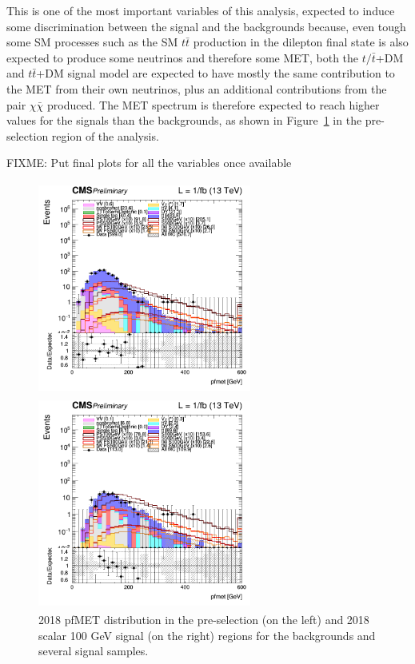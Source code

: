 \documentclass[a4paper, 10pt, openright]{report}
\begin{document}
This is one of the most important variables of this analysis, expected to induce some discrimination between the signal and the backgrounds because, even tough some \ac{SM} processes such as the \ac{SM} $t \bar t$ production in the dilepton final state is also expected to produce some neutrinos and therefore some \ac{MET}, both the $t/ \bar t$+DM and $t \bar t$+DM signal model are expected to have mostly the same contribution to the \ac{MET} from their own neutrinos, plus an additional contributions from the pair $\chi \bar \chi$ produced. The \ac{MET} spectrum is therefore expected to reach higher values for the signals than the backgrounds, as shown in Figure~\ref{fig:SRdiscMET} in the pre-selection region of the analysis.

\color{red} FIXME: Put final plots for all the variables once available \color{black}

\begin{figure}[htbp]
\centering
\begin{minipage}[b]{.47\textwidth}
\includegraphics[width=7cm, height=7cm]{figs/2018/log_cratio_topCR_ll_METcorrected_pt.png}
\end{minipage}\hfill
\begin{minipage}[b]{.47\textwidth}
\includegraphics[width=7cm, height=7cm]{figs/2018/log_cratio_topCR_ll_DNN_signal0_scalar100_METcorrected_pt.png}
\end{minipage}\hfill
\caption{2018 pf\ac{MET} distribution in the pre-selection (on the left) and 2018 scalar 100 GeV signal (on the right) regions for the backgrounds and several signal samples.}
\label{fig:SRdiscMET}
\end{figure}
\end{document}
